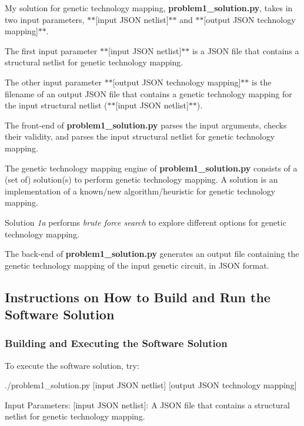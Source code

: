 My solution for genetic technology mapping, {\bfseries problem1\+\_\+solution.\+py}, takes in two input parameters, $\ast$$\ast$\mbox{[}input J\+S\+O\+N netlist\mbox{]}$\ast$$\ast$ and $\ast$$\ast$\mbox{[}output J\+S\+O\+N technology mapping\mbox{]}$\ast$$\ast$.

The first input parameter $\ast$$\ast$\mbox{[}input J\+S\+O\+N netlist\mbox{]}$\ast$$\ast$ is a J\+S\+O\+N file that contains a structural netlist for genetic technology mapping.

The other input parameter $\ast$$\ast$\mbox{[}output J\+S\+O\+N technology mapping\mbox{]}$\ast$$\ast$ is the filename of an output J\+S\+O\+N file that contains a genetic technology mapping for the input structural netlist ($\ast$$\ast$\mbox{[}input J\+S\+O\+N netlist\mbox{]}$\ast$$\ast$).

The front-\/end of {\bfseries problem1\+\_\+solution.\+py} parses the input arguments, checks their validity, and parses the input structural netlist for genetic technology mapping.

The genetic technology mapping engine of {\bfseries problem1\+\_\+solution.\+py} consists of a (set of) solution(s) to perform genetic technology mapping. A solution is an implementation of a known/new algorithm/heuristic for genetic technology mapping.

Solution {\itshape 1a} performs {\itshape brute force search} to explore different options for genetic technology mapping.

The back-\/end of {\bfseries problem1\+\_\+solution.\+py} generates an output file containing the genetic technology mapping of the input genetic circuit, in J\+S\+O\+N format.

\subsection*{Instructions on How to Build and Run the Software Solution}

\subsubsection*{Building and Executing the Software Solution}

To execute the software solution, try\+: \begin{DoxyVerb}./problem1_solution.py [input JSON netlist] [output JSON technology mapping]
\end{DoxyVerb}


Input Parameters\+: \mbox{[}input J\+S\+O\+N netlist\mbox{]}\+: A J\+S\+O\+N file that contains a structural netlist for genetic technology mapping.


